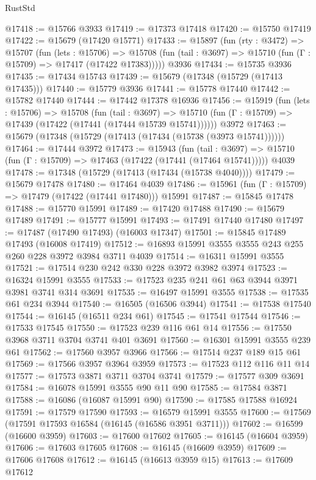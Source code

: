 \begin{lexlean}{RustStd}
\begin{coremodule}
@17418 := @15766 @3933
@17419 := @17373 @17418
@17420 := @15750 @17419
@17422 := @15679 (@17420 @15771)
@17433 := @15897
    (fun (rty : @3472) =>
    @15707
      (fun (lets : @15706) =>
      @15708 (fun (tail : @3697) => @15710 (fun (Γ : @15709) => @17417 (@17422 @17383)))))
    @3936
@17434 := @15735 @3936
@17435 := @17434 @15743
@17439 := @15679 (@17348 (@15729 (@17413 @17435)))
@17440 := @15779 @3936
@17441 := @15778 @17440
@17442 := @15782 @17440
@17444 := @17442 @17378 @16936
@17456 := @15919
    (fun (lets : @15706) =>
    @15708
      (fun (tail : @3697) =>
      @15710 (fun (Γ : @15709) => @17439 (@17422 (@17441 (@17444 @15739 @15741))))))
    @3972
@17463 := @15679 (@17348 (@15729 (@17413 (@17434 (@15738 (@3973 @15741))))))
@17464 := @17444 @3972
@17473 := @15943
    (fun (tail : @3697) => @15710 (fun (Γ : @15709) => @17463 (@17422 (@17441 (@17464 @15741)))))
    @4039
@17478 := @17348 (@15729 (@17413 (@17434 (@15738 @4040))))
@17479 := @15679 @17478
@17480 := @17464 @4039
@17486 := @15961 (fun (Γ : @15709) => @17479 (@17422 (@17441 @17480))) @15991
@17487 := @15845 @17478
@17488 := @15770 @15991
@17489 := @17420 @17488
@17490 := @15679 @17489
@17491 := @15777 @15991
@17493 := @17491 @17440 @17480
@17497 := @17487 (@17490 @17493) (@16003 @17347)
@17501 := @15845 @17489 @17493 (@16008 @17419)
@17512 := @16893 @15991 @3555 @3555 @243 @255 @260 @228 @3972 @3984 @3711 @4039
@17514 := @16311 @15991 @3555
@17521 := @17514 @230 @242 @330 @228 @3972 @3982 @3974
@17523 := @16324 @15991 @3555
@17533 := @17523 @235 @241 @61 @63 @3944 @3971 @3981 @3741 @314 @3691
@17535 := @16497 @15991 @3555
@17538 := @17535 @61 @234 @3944
@17540 := @16505 (@16506 @3944)
@17541 := @17538 @17540
@17544 := @16145 (@16511 @234 @61)
@17545 := @17541 @17544
@17546 := @17533 @17545
@17550 := @17523 @239 @116 @61 @14
@17556 := @17550 @3968 @3711 @3704 @3741 @401 @3691
@17560 := @16301 @15991 @3555 @239 @61
@17562 := @17560 @3957 @3966
@17566 := @17514 @237 @189 @15 @61
@17569 := @17566 @3957 @3964 @3959
@17573 := @17523 @112 @116 @11 @14
@17577 := @17573 @3871 @3711 @3704 @3741
@17579 := @17577 @309 @3691
@17584 := @16078 @15991 @3555 @90 @11 @90
@17585 := @17584 @3871
@17588 := @16086 (@16087 @15991 @90)
@17590 := @17585 @17588 @16924
@17591 := @17579 @17590
@17593 := @16579 @15991 @3555
@17600 := @17569 (@17591 @17593 @16584 (@16145 (@16586 @3951 @3711)))
@17602 := @16599 (@16600 @3959)
@17603 := @17600 @17602
@17605 := @16145 (@16604 @3959)
@17606 := @17603 @17605
@17608 := @16145 (@16609 @3959)
@17609 := @17606 @17608
@17612 := @16145 (@16613 @3959 @15)
@17613 := @17609 @17612

\end{coremodule}
\end{lexlean}

